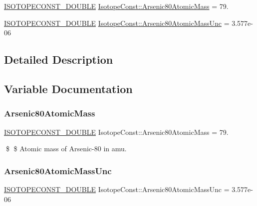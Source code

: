 \begin{DoxyCompactItemize}
\item 
\mbox{\hyperlink{group___isotope_const-_macros_ga8f45a7272ce02c0b4c65c44636ed719a}{I\+S\+O\+T\+O\+P\+E\+C\+O\+N\+S\+T\+\_\+\+D\+O\+U\+B\+LE}} \mbox{\hyperlink{group___isotope_const-_arsenic-_as80_ga36a004fe0ba47681762be4866605c0d3}{Isotope\+Const\+::\+Arsenic80\+Atomic\+Mass}} = 79.
\item 
\mbox{\hyperlink{group___isotope_const-_macros_ga8f45a7272ce02c0b4c65c44636ed719a}{I\+S\+O\+T\+O\+P\+E\+C\+O\+N\+S\+T\+\_\+\+D\+O\+U\+B\+LE}} \mbox{\hyperlink{group___isotope_const-_arsenic-_as80_ga22563c3004a6e7422d64239df6fb2b81}{Isotope\+Const\+::\+Arsenic80\+Atomic\+Mass\+Unc}} = 3.\+577e-\/06
\end{DoxyCompactItemize}


\subsection{Detailed Description}


\subsection{Variable Documentation}
\mbox{\label{group___isotope_const-_arsenic-_as80_ga36a004fe0ba47681762be4866605c0d3}} 
\subsubsection{\texorpdfstring{Arsenic80\+Atomic\+Mass}{Arsenic80AtomicMass}}
{\footnotesize\ttfamily \mbox{\hyperlink{group___isotope_const-_macros_ga8f45a7272ce02c0b4c65c44636ed719a}{I\+S\+O\+T\+O\+P\+E\+C\+O\+N\+S\+T\+\_\+\+D\+O\+U\+B\+LE}} Isotope\+Const\+::\+Arsenic80\+Atomic\+Mass = 79.}

\$ \$ Atomic mass of Arsenic-\/80 in amu. \mbox{\label{group___isotope_const-_arsenic-_as80_ga22563c3004a6e7422d64239df6fb2b81}} 
\subsubsection{\texorpdfstring{Arsenic80\+Atomic\+Mass\+Unc}{Arsenic80AtomicMassUnc}}
{\footnotesize\ttfamily \mbox{\hyperlink{group___isotope_const-_macros_ga8f45a7272ce02c0b4c65c44636ed719a}{I\+S\+O\+T\+O\+P\+E\+C\+O\+N\+S\+T\+\_\+\+D\+O\+U\+B\+LE}} Isotope\+Const\+::\+Arsenic80\+Atomic\+Mass\+Unc = 3.\+577e-\/06}

